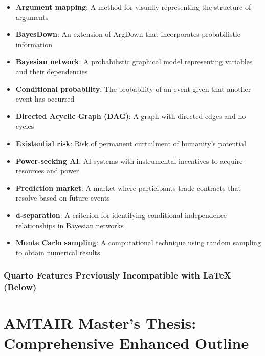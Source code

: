 \documentclass[
  11pt,
  letterpaper,
]{book}
\providecommand{\tightlist}{%
  \setlength{\itemsep}{0pt}\setlength{\parskip}{0pt}}
\begin{document}
\begin{itemize}
\tightlist
\item
  \textbf{Argument mapping}: A method for visually representing the
  structure of arguments\\
\item
  \textbf{BayesDown}: An extension of ArgDown that incorporates
  probabilistic information\\
\item
  \textbf{Bayesian network}: A probabilistic graphical model
  representing variables and their dependencies\\
\item
  \textbf{Conditional probability}: The probability of an event given
  that another event has occurred\\
\item
  \textbf{Directed Acyclic Graph (DAG)}: A graph with directed edges and
  no cycles\\
\item
  \textbf{Existential risk}: Risk of permanent curtailment of humanity's
  potential\\
\item
  \textbf{Power-seeking AI}: AI systems with instrumental incentives to
  acquire resources and power\\
\item
  \textbf{Prediction market}: A market where participants trade
  contracts that resolve based on future events\\
\item
  \textbf{d-separation}: A criterion for identifying conditional
  independence relationships in Bayesian networks\\
\item
  \textbf{Monte Carlo sampling}: A computational technique using random
  sampling to obtain numerical results
\end{itemize}

\subsection*{Quarto Features Previously Incompatible with LaTeX
(Below)}\label{quarto-features-previously-incompatible-with-latex-below}


\chapter{AMTAIR Master's Thesis: Comprehensive Enhanced
Outline}\label{amtair-masters-thesis-comprehensive-enhanced-outline}
\end{document}
